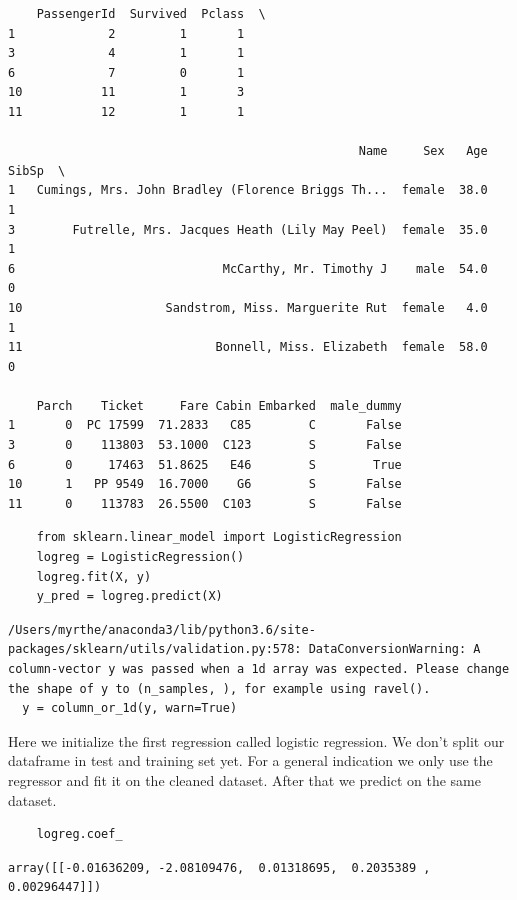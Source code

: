 \documentclass[11pt]{article}
\begin{document}
\begin{verbatim}
    PassengerId  Survived  Pclass  \
1             2         1       1   
3             4         1       1   
6             7         0       1   
10           11         1       3   
11           12         1       1   

                                                 Name     Sex   Age  SibSp  \
1   Cumings, Mrs. John Bradley (Florence Briggs Th...  female  38.0      1   
3        Futrelle, Mrs. Jacques Heath (Lily May Peel)  female  35.0      1   
6                             McCarthy, Mr. Timothy J    male  54.0      0   
10                    Sandstrom, Miss. Marguerite Rut  female   4.0      1   
11                           Bonnell, Miss. Elizabeth  female  58.0      0   

    Parch    Ticket     Fare Cabin Embarked  male_dummy  
1       0  PC 17599  71.2833   C85        C       False  
3       0    113803  53.1000  C123        S       False  
6       0     17463  51.8625   E46        S        True  
10      1   PP 9549  16.7000    G6        S       False  
11      0    113783  26.5500  C103        S       False  
\end{verbatim}

\begin{verbatim}
    from sklearn.linear_model import LogisticRegression
    logreg = LogisticRegression()
    logreg.fit(X, y)
    y_pred = logreg.predict(X)
\end{verbatim}

\begin{verbatim}
/Users/myrthe/anaconda3/lib/python3.6/site-packages/sklearn/utils/validation.py:578: DataConversionWarning: A column-vector y was passed when a 1d array was expected. Please change the shape of y to (n_samples, ), for example using ravel().
  y = column_or_1d(y, warn=True)

\end{verbatim}

Here we initialize the first regression called logistic regression. We
don't split our dataframe in test and training set yet. For a general
indication we only use the regressor and fit it on the cleaned dataset.
After that we predict on the same dataset.

\begin{verbatim}
    logreg.coef_
\end{verbatim}

\begin{verbatim}
array([[-0.01636209, -2.08109476,  0.01318695,  0.2035389 ,  0.00296447]])
\end{verbatim}
\end{document}
